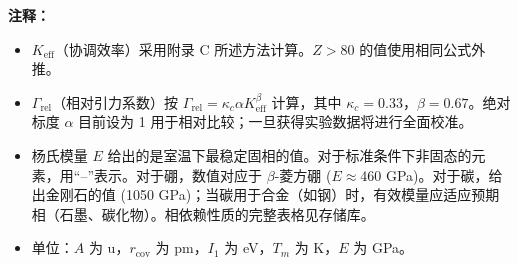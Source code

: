 \documentclass[12pt,a4paper]{article}
\newcommand{\Keff}{K_{\mathrm{eff}}}
\begin{document}
	\textbf{注释：}
	\begin{itemize}
		\item \(\Keff\)（协调效率）采用附录 C 所述方法计算。\(Z>80\) 的值使用相同公式外推。
		\item \(\Gamma_{\text{rel}}\)（相对引力系数）按 \(\Gamma_{\text{rel}} = \kappa_c \alpha \Keff^{\beta}\) 计算，其中 \(\kappa_c=0.33\)，\(\beta=0.67\)。绝对标度 \(\alpha\) 目前设为 1 用于相对比较；一旦获得实验数据将进行全面校准。
		\item 杨氏模量 \(E\) 给出的是室温下最稳定固相的值。对于标准条件下非固态的元素，用“–”表示。对于硼，数值对应于 \(\beta\)-菱方硼 (\(E \approx 460\) GPa)。对于碳，给出金刚石的值 (1050 GPa)；当碳用于合金（如钢）时，有效模量应适应预期相（石墨、碳化物）。相依赖性质的完整表格见存储库。
		\item 单位：\(A\) 为 u，\(r_{\text{cov}}\) 为 pm，\(I_1\) 为 eV，\(T_m\) 为 K，\(E\) 为 GPa。
	\end{itemize}
	
\end{document}
